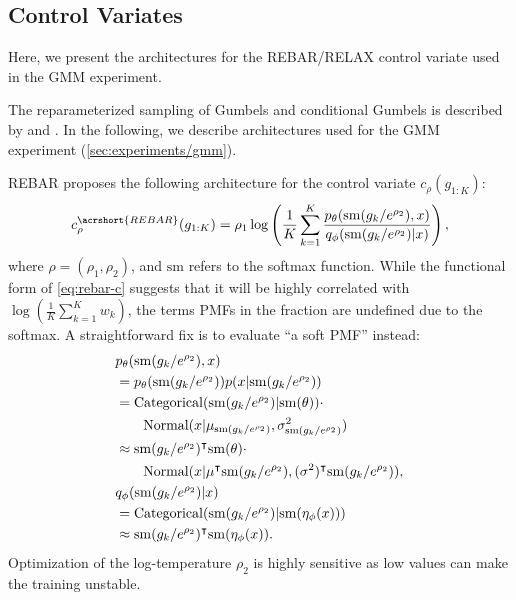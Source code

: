 \subsection{Control Variates}
Here, we present the architectures for the \acrshort{REBAR}/\acrshort{RELAX} control variate used in the \gls{GMM} experiment.

The reparameterized sampling of Gumbels and conditional Gumbels is described by \citet[Appendix C]{tucker2017rebar} and \citet[Appendix B]{grathwohl2018backpropagation}.
In the following, we describe architectures used for the \gls{GMM} experiment (\cref{sec:experiments/gmm}).

\Acrshort{REBAR} proposes the following architecture for the control variate $c_\rho(g_{1:K})$:
\begin{align}
    c_\rho^{\acrshort{REBAR}}(g_{1:K}) = \rho_1 \log\left(\frac{1}{K} \sum_{k = 1}^K \frac{p_\theta(\mathrm{sm}(g_k / e^{\rho_2}), x)}{q_\phi(\mathrm{sm}(g_k / e^{\rho_2}) \given x)}\right), \label{eq:rebar-c}
\end{align}
where $\rho = (\rho_1, \rho_2)$, and $\mathrm{sm}$ refers to the softmax function.
While the functional form of \cref{eq:rebar-c} suggests that it will be highly correlated with $\log(\frac{1}{K} \sum_{k = 1}^K w_k)$, the terms \glspl{PMF} in the fraction are undefined due to the softmax.
A straightforward fix is to evaluate ``a soft \gls{PMF}'' instead:
\begin{align*}
    &p_\theta(\mathrm{sm}(g_k / e^{\rho_2}), x) \\
    &= p_\theta(\mathrm{sm}(g_k / e^{\rho_2})) p(x \lvert \mathrm{sm}(g_k / e^{\rho_2})) \\
    &= \mathrm{Categorical}(\mathrm{sm}(g_k / e^{\rho_2}) \lvert \mathrm{sm}(\theta)) \cdot \\
    & \qquad\mathrm{Normal}(x \lvert \mu_{\mathrm{sm}(g_k / e^{\rho_2})}, \sigma_{\mathrm{sm}(g_k / e^{\rho_2})}^2) \\
    &\approx  \mathrm{sm}(g_k / e^{\rho_2})^\intercal \mathrm{sm}(\theta) \cdot \\
    & \qquad \mathrm{Normal}(x \lvert \mu^\intercal \mathrm{sm}(g_k / e^{\rho_2}), (\sigma^2)^\intercal \mathrm{sm}(g_k / e^{\rho_2})), \\
    &q_\phi(\mathrm{sm}(g_k / e^{\rho_2}) \lvert x) \\
    &= \mathrm{Categorical}(\mathrm{sm}(g_k / e^{\rho_2}) \lvert \mathrm{sm}(\eta_\phi(x))) \\
    &\approx \mathrm{sm}(g_k / e^{\rho_2})^\intercal \mathrm{sm}(\eta_\phi(x)).
\end{align*}
Optimization of the log-temperature $\rho_2$ is highly sensitive as low values can make the training unstable.

